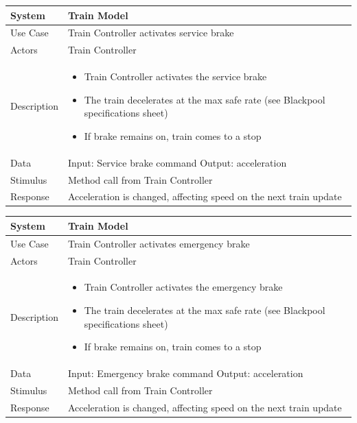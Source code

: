 \documentclass{article}
\begin{document}
    \begin{longtable}{
    || >{\raggedright\arraybackslash}m{}
    | >{\raggedright\arraybackslash}m{}||}
    \hline
    \textbf{System} &  \textbf{Train Model} \\
    \hline
    Use Case & Train Controller activates service brake\\
    \hline
    Actors & Train Controller\\
    \hline
    Description & \begin{itemize}
        \item Train Controller activates the service brake
        \item The train decelerates at the max safe rate (see Blackpool specifications sheet)
        \item If brake remains on, train comes to a stop
    \end{itemize}\\
    \hline
    Data & Input: Service brake command \newline Output: acceleration\\
    \hline
    Stimulus & Method call from Train Controller\\
    \hline
    Response & Acceleration is changed, affecting speed on the next train update\\
    \hline
    \end{longtable}
    
    \begin{longtable}{
    || >{\raggedright\arraybackslash}m{}
    | >{\raggedright\arraybackslash}m{}||}
    \hline
    \textbf{System} &  \textbf{Train Model} \\
    \hline
    Use Case & Train Controller activates emergency brake\\
    \hline
    Actors & Train Controller\\
    \hline
    Description & \begin{itemize}
        \item Train Controller activates the emergency brake
        \item The train decelerates at the max safe rate (see Blackpool specifications sheet)
        \item If brake remains on, train comes to a stop
    \end{itemize}\\
    \hline
    Data & Input: Emergency brake command \newline Output: acceleration\\
    \hline
    Stimulus & Method call from Train Controller\\
    \hline
    Response & Acceleration is changed, affecting speed on the next train update\\
    \hline
    \end{longtable}
    
\end{document}
